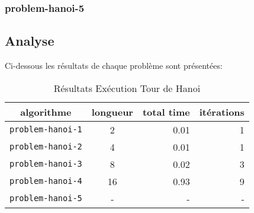 \documentclass[../CSC_5RO16_TA_TP5.tex]{subfiles}
\begin{document}
\subsubsection{problem-hanoi-5}
\begin{scriptsize}\mycode
    
\end{scriptsize}


\subsection{Analyse}
\noindent Ci-dessous les résultats de chaque problème sont présentées:
\begin{table}[H]
    \centering
    \begin{tabular}{ccrr}
        algorithme & longueur & total time & itérations\\
        \hline\hline
        \texttt{problem-hanoi-1} & 2 & 0.01 & 1\\
        \texttt{problem-hanoi-2} & 4 & 0.01 & 1\\
        \texttt{problem-hanoi-3} & 8 & 0.02 & 3\\
        \texttt{problem-hanoi-4} & 16 & 0.93 & 9\\
        \texttt{problem-hanoi-5} & - & - & -\\
        \hline
    \end{tabular}
    \caption{Résultats Exécution Tour de Hanoi}
    \label{}
\end{table}
\end{document}
